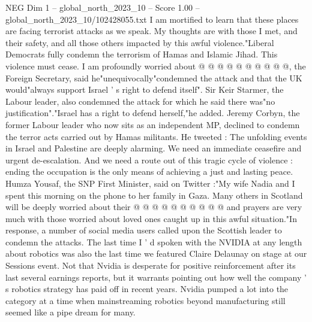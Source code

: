 \begin{textsample}{NEG Dim 1 – global\_north\_2023\_10 – Score 1.00 – global\_north\_2023\_10/102428055.txt}
I am mortified to learn that these places are facing terrorist attacks as we speak.
My thoughts are with those I met, and their safety, and all those others impacted by this awful violence."Liberal Democrats fully condemn the terrorism of Hamas and Islamic Jihad.
This violence must cease.
I am profoundly worried about @ @ @ @ @ @ @ @ @ @, the Foreign Secretary, said he"unequivocally"condemned the attack and that the UK would"always support Israel ' s right to defend itself".
Sir Keir Starmer, the Labour leader, also condemned the attack for which he said there was"no justification"."Israel has a right to defend herself,"he added.
Jeremy Corbyn, the former Labour leader who now sits as an independent MP, declined to condemn the terror acts carried out by Hamas militants.
He tweeted : The unfolding events in Israel and Palestine are deeply alarming.
We need an immediate ceasefire and urgent de-escalation.
And we need a route out of this tragic cycle of violence : ending the occupation is the only means of achieving a just and lasting peace.
Humza Yousaf, the SNP First Minister, said on Twitter :"My wife Nadia and I spent this morning on the phone to her family in Gaza.
Many others in Scotland will be deeply worried about their @ @ @ @ @ @ @ @ @ @ and prayers are very much with those worried about loved ones caught up in this awful situation."In response, a number of social media users called upon the Scottish leader to condemn the attacks.
The last time I ' d spoken with the NVIDIA at any length about robotics was also the last time we featured Claire Delaunay on stage at our Sessions event.
Not that Nvidia is desperate for positive reinforcement after its last several earnings reports, but it warrants pointing out how well the company ' s robotics strategy has paid off in recent years.
Nvidia pumped a lot into the category at a time when mainstreaming robotics beyond manufacturing still seemed like a pipe dream for many.

\end{textsample}
